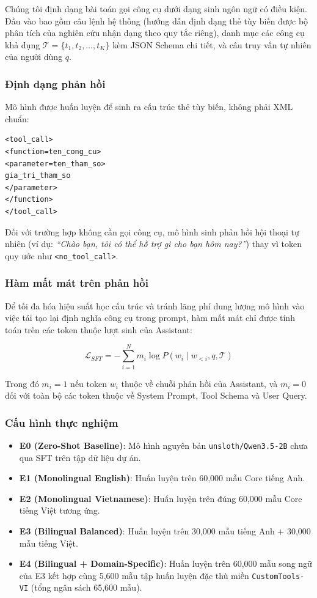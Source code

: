 \documentclass[10pt,twocolumn,a4paper]{article}
\begin{document}
Chúng tôi định dạng bài toán gọi công cụ dưới dạng sinh ngôn ngữ có điều kiện. Đầu vào bao gồm câu lệnh hệ thống (hướng dẫn định dạng thẻ tùy biến được bộ phân tích của nghiên cứu nhận dạng theo quy tắc riêng), danh mục các công cụ khả dụng $\mathcal{T} = \{t_1, t_2, \dots, t_K\}$ kèm JSON Schema chi tiết, và câu truy vấn tự nhiên của người dùng $q$.

\subsubsection{Định dạng phản hồi}
Mô hình được huấn luyện để sinh ra cấu trúc thẻ tùy biến, không phải XML chuẩn:
\begin{verbatim}
<tool_call>
<function=ten_cong_cu>
<parameter=ten_tham_so>
gia_tri_tham_so
</parameter>
</function>
</tool_call>
\end{verbatim}
Đối với trường hợp không cần gọi công cụ, mô hình sinh phản hồi hội thoại tự nhiên (ví dụ: \textit{``Chào bạn, tôi có thể hỗ trợ gì cho bạn hôm nay?''}) thay vì token quy ước như \texttt{<no\_tool\_call>}.

\subsubsection{Hàm mất mát trên phản hồi}
Để tối đa hóa hiệu suất học cấu trúc và tránh lãng phí dung lượng mô hình vào việc tái tạo lại định nghĩa công cụ trong prompt, hàm mất mát chỉ được tính toán trên các token thuộc lượt sinh của Assistant:

$$\mathcal{L}_{SFT} = -\sum_{i=1}^{N} m_i \log P(w_i \mid w_{<i}, q, \mathcal{T})$$

Trong đó $m_i = 1$ nếu token $w_i$ thuộc về chuỗi phản hồi của Assistant, và $m_i = 0$ đối với toàn bộ các token thuộc về System Prompt, Tool Schema và User Query.

\subsubsection{Cấu hình thực nghiệm}
\begin{itemize}
    \item \textbf{E0 (Zero-Shot Baseline)}: Mô hình nguyên bản \texttt{unsloth/Qwen3.5-2B} chưa qua SFT trên tập dữ liệu dự án.
    \item \textbf{E1 (Monolingual English)}: Huấn luyện trên 60,000 mẫu Core tiếng Anh.
    \item \textbf{E2 (Monolingual Vietnamese)}: Huấn luyện trên đúng 60,000 mẫu Core tiếng Việt tương ứng.
    \item \textbf{E3 (Bilingual Balanced)}: Huấn luyện trên 30,000 mẫu tiếng Anh + 30,000 mẫu tiếng Việt.
    \item \textbf{E4 (Bilingual + Domain-Specific)}: Huấn luyện trên 60,000 mẫu song ngữ của E3 kết hợp cùng 5,600 mẫu tập huấn luyện đặc thù miền \texttt{CustomTools-VI} (tổng ngân sách 65,600 mẫu).
\end{itemize}
\end{document}
